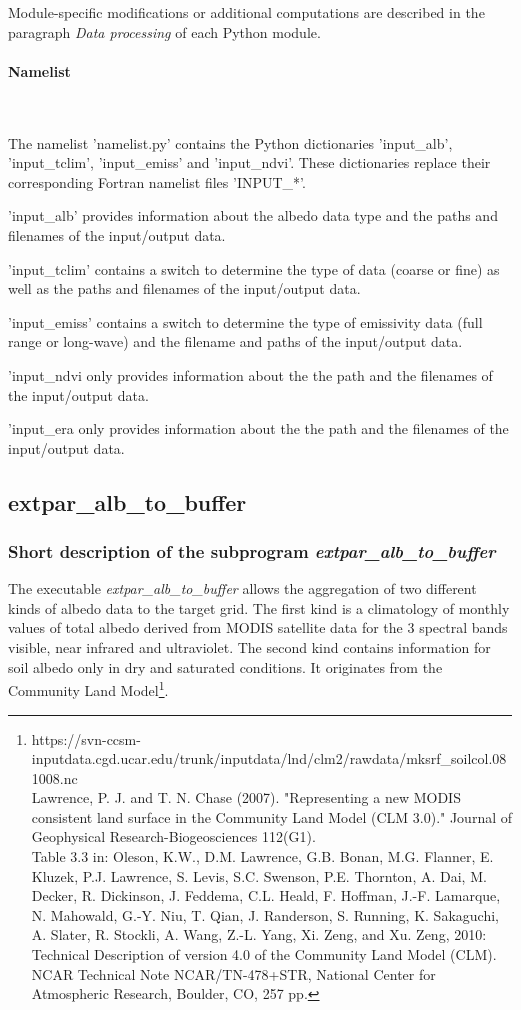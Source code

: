 \documentclass[a4paper,10pt,DIV14,BCOR1cm,titlepage,twoside]{scrartcl}
\begin{document}
\noindent Module-specific modifications or additional computations are described in the paragraph \textit{Data processing} of each Python module.
\paragraph{Namelist}\ \par\medskip\noindent
\noindent The namelist 'namelist.py' contains the Python dictionaries 'input\_alb', 'input\_tclim', 'input\_emiss' and 'input\_ndvi'. These dictionaries replace their corresponding Fortran namelist files 'INPUT\_*'.

\noindent 'input\_alb' provides information about the albedo data type and the paths and filenames of the input/output data.

\noindent'input\_tclim' contains a switch to determine the type of data (coarse or fine) as well as the paths and filenames of the input/output data.

\noindent'input\_emiss' contains a switch to determine the type of emissivity data (full range or long-wave) and the filename and paths of the input/output data.

\noindent'input\_ndvi only provides information about the the path and the filenames of the input/output data.

\noindent'input\_era only provides information about the the path and the filenames of the input/output data.

\subsection{extpar\_alb\_to\_buffer}\label{extpar_alb_to_buffer}
\subsubsection{Short description of the subprogram \textit{extpar\_alb\_to\_buffer}}
The executable \textit{extpar\_alb\_to\_buffer} allows the aggregation of two different kinds of albedo data to the target grid. The first kind is a climatology of monthly values of total albedo derived from MODIS satellite data for the 3 spectral bands visible, near infrared and ultraviolet. The second kind contains information for soil albedo only in dry and saturated conditions. It originates from the Community Land Model\footnote{https://svn-ccsm-inputdata.cgd.ucar.edu/trunk/inputdata/lnd/clm2/rawdata/mksrf\_soilcol.081008.nc \\ Lawrence, P. J. and T. N. Chase (2007). "Representing a new MODIS consistent land surface in the Community Land Model (CLM 3.0)." Journal of Geophysical Research-Biogeosciences 112(G1). \\Table 3.3 in: Oleson, K.W., D.M. Lawrence, G.B. Bonan, M.G. Flanner, E. Kluzek, P.J. Lawrence, S. Levis, S.C. Swenson, P.E. Thornton, A. Dai, M. Decker, R. Dickinson, J. Feddema, C.L. Heald, F. Hoffman, J.-F. Lamarque, N. Mahowald, G.-Y. Niu, T. Qian, J. Randerson, S. Running, K. Sakaguchi, A. Slater, R. Stockli, A. Wang, Z.-L. Yang, Xi. Zeng, and Xu. Zeng, 2010: Technical Description of version 4.0 of the Community Land Model (CLM). NCAR Technical Note NCAR/TN-478+STR, National Center for Atmospheric Research, Boulder, CO, 257 pp.}.\par\medskip\noindent
\end{document}
